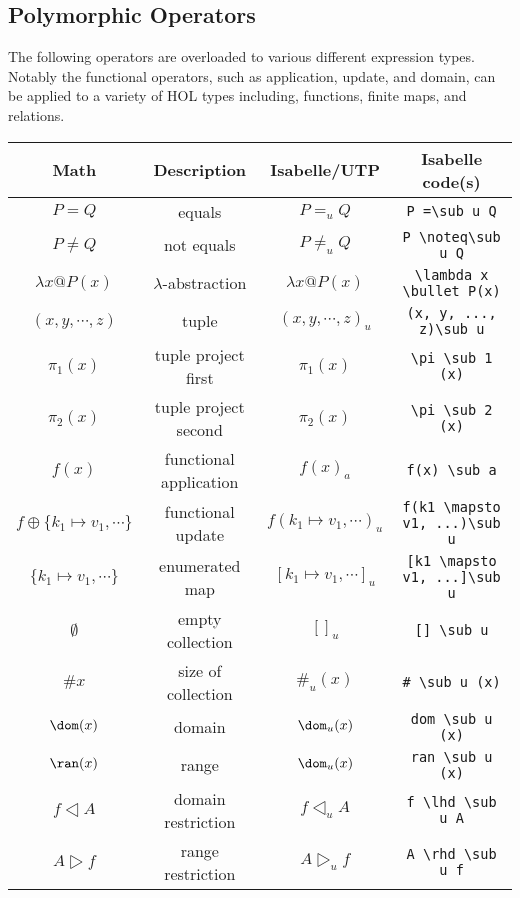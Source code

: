 \documentclass[11pt]{article}
\begin{document}
\subsection{Polymorphic Operators}

The following operators are overloaded to various different expression types. Notably the functional operators, such as
application, update, and domain, can be applied to a variety of HOL types including, functions, finite maps, and
relations.

\begin{center}
\begin{tabular}{|c|c|c|c|} \hline
  \textbf{Math}             & \textbf{Description}        & \textbf{Isabelle/UTP}   & \textbf{Isabelle code(s)} \\ \hline
  $P = Q$                   & equals                      & $P =_u Q$               & \verb|P =\sub u Q| \\ 
  $P \neq Q$                & not equals                  & $P \neq_u Q$            & \verb|P \noteq\sub u Q| \\ 
  $\lambda x @ P(x)$        & $\lambda$-abstraction       & $\lambda x @ P(x)$      & \verb|\lambda x \bullet P(x)| \\
  $(x,y,\cdots,z)$          & tuple                       & $(x, y, \cdots, z)_u$   & \verb|(x, y, ..., z)\sub u| \\
  $\pi_1(x)$                & tuple project first         & $\pi_1(x)$              & \verb|\pi \sub 1 (x)| \\
  $\pi_2(x)$                & tuple project second        & $\pi_2(x)$              & \verb|\pi \sub 2 (x)| \\
  $f(x)$                    & functional application      & $f(x)_a$                & \verb|f(x) \sub a| \\
  $f \oplus \{k_1 \mapsto v_1, \cdots\}$ 
                            & functional update           & $f(k_1 \mapsto v_1, \cdots)_u$ & \verb|f(k1 \mapsto v1, ...)\sub u| \\
  $\{k_1 \mapsto v_1, \cdots\}$ & enumerated map           & $[k_1 \mapsto v_1, \cdots]_u$ & \verb|[k1 \mapsto v1, ...]\sub u| \\
  $\emptyset$               & empty collection            & $[]_u$                  & \verb|[] \sub u| \\
  $\#x$                     & size of collection          & $\#_u(x)$               & \verb|# \sub u (x)| \\ 
  $\dom(x)$                 & domain                      & $\dom_u(x)$             & \verb|dom \sub u (x)| \\
  $\ran(x)$                 & range                       & $\dom_u(x)$             & \verb|ran \sub u (x)| \\
  $f \dres A$               & domain restriction          & $f \dres_u A$           & \verb|f \lhd \sub u A| \\
  $A \rres f$               & range restriction           & $A \rres_u f$           & \verb|A \rhd \sub u f| \\
  \hline
\end{tabular}
\end{center}
\end{document}
